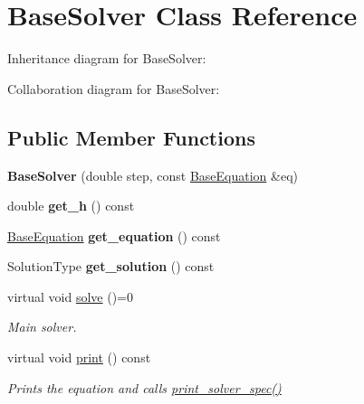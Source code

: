 \hypertarget{classBaseSolver}{}\section{Base\+Solver Class Reference}
\label{classBaseSolver}


Inheritance diagram for Base\+Solver\+:


Collaboration diagram for Base\+Solver\+:
\subsection*{Public Member Functions}
\begin{DoxyCompactItemize}
\item 
\mbox{\label{classBaseSolver_a67dba5908628ed3dd89735d9e4c4a436}} 
{\bfseries Base\+Solver} (double step, const \hyperlink{classBaseEquation}{Base\+Equation} \&eq)
\item 
\mbox{\label{classBaseSolver_a4f4ada66347913e8ac7d6c11d2c87b2c}} 
double {\bfseries get\+\_\+h} () const
\item 
\mbox{\label{classBaseSolver_ad23f3587017d0fdcca0620440a2d2ef6}} 
\hyperlink{classBaseEquation}{Base\+Equation} {\bfseries get\+\_\+equation} () const
\item 
\mbox{\label{classBaseSolver_a6c867079cffc2aaa2af28425b4ea9d40}} 
Solution\+Type {\bfseries get\+\_\+solution} () const
\item 
\mbox{\label{classBaseSolver_a57f3b4ddec8693c61917aa37a2bac660}} 
virtual void \hyperlink{classBaseSolver_a57f3b4ddec8693c61917aa37a2bac660}{solve} ()=0
\begin{DoxyCompactList}\small\item\em Main solver. \end{DoxyCompactList}\item 
\mbox{\label{classBaseSolver_a8dd30ba31c4fe6268f1bc779b3b1c8fa}} 
virtual void \hyperlink{classBaseSolver_a8dd30ba31c4fe6268f1bc779b3b1c8fa}{print} () const
\begin{DoxyCompactList}\small\item\em Prints the equation and calls \hyperlink{classBaseSolver_a44725e315b208c0ee69ba8fd5d172e09}{print\+\_\+solver\+\_\+spec()} \end{DoxyCompactList}\item 

\end{DoxyCompactItemize}
